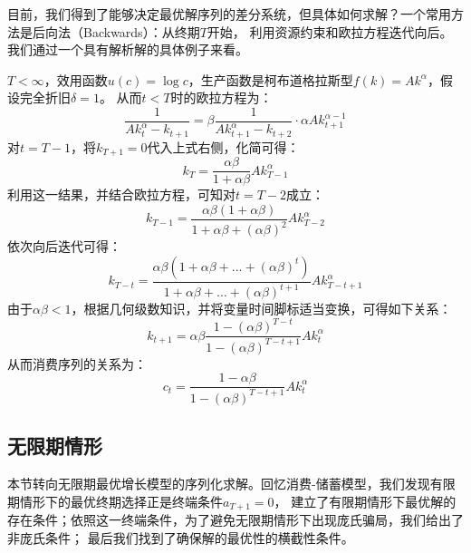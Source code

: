 目前，我们得到了能够决定最优解序列的差分系统，但具体如何求解？一个常用方法是后向法（Backwards）：从终期$T$开始，
利用资源约束和欧拉方程迭代向后。我们通过一个具有解析解的具体例子来看。
\begin{example}
    $T<\infty$，效用函数$u(c) = \log c$，生产函数是柯布道格拉斯型$f(k) = Ak^{\alpha}$，假设完全折旧$\delta = 1$。
    从而$t<T$时的欧拉方程为：
    \begin{equation*}
        \frac{1}{A k_t^\alpha-k_{t+1}}=\beta \frac{1}{A k_{t+1}^\alpha-k_{t+2}} \cdot \alpha A k_{t+1}^{\alpha-1}
    \end{equation*}
    对$t=T-1$，将$k_{T+1}=0$代入上式右侧，化简可得：
    \begin{equation*}
        k_T=\frac{\alpha \beta}{1+\alpha \beta} A k_{T-1}^\alpha
    \end{equation*}
    利用这一结果，并结合欧拉方程，可知对$t=T-2$成立：
    \begin{equation*}
        k_{T-1}=\frac{\alpha \beta(1+\alpha \beta)}{1+\alpha \beta+(\alpha \beta)^2} A k_{T-2}^\alpha
    \end{equation*}
    依次向后迭代可得：
    \begin{equation*}
        k_{T-t} = \frac{\alpha \beta\left(1+\alpha \beta+\ldots+(\alpha \beta)^t\right)}
            {1+\alpha \beta+\ldots+(\alpha \beta)^{t+1}} A k_{T-t+1}^\alpha
    \end{equation*}
    由于$\alpha\beta<1$，根据几何级数知识，并将变量时间脚标适当变换，可得如下关系：
    \begin{equation*}
        k_{t+1}=\alpha \beta \frac{1-(\alpha \beta)^{T-t}}{1-(\alpha \beta)^{T-t+1}} A k_t^\alpha
    \end{equation*}
    从而消费序列的关系为：
    \begin{equation*}
        c_t=\frac{1-\alpha \beta}{1-(\alpha \beta)^{T-t+1}} A k_t^\alpha
    \end{equation*}
\end{example}


\subsection{无限期情形} \label{subsec-rck-infinite}

本节转向无限期最优增长模型的序列化求解。回忆消费-储蓄模型，我们发现有限期情形下的最优终期选择正是终端条件$a_{T+1}=0$，
建立了有限期情形下最优解的存在条件；依照这一终端条件，为了避免无限期情形下出现庞氏骗局，我们给出了非庞氏条件；
最后我们找到了确保解的最优性的横截性条件。

